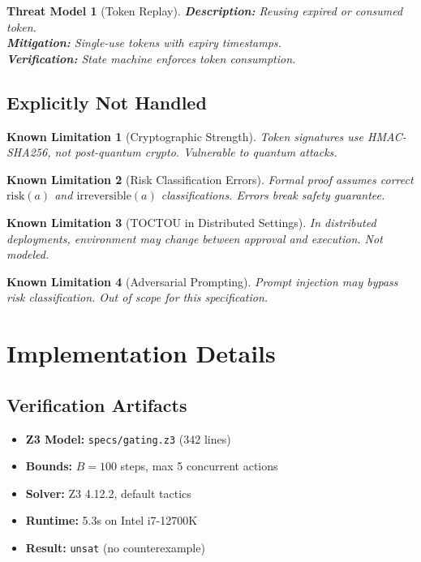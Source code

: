 \documentclass[12pt]{article}
\newtheorem{threat}{Threat Model}[section]
\newtheorem{limitation}{Known Limitation}[section]
\begin{document}
\begin{threat}[Token Replay]
\textbf{Description:} Reusing expired or consumed token.\\
\textbf{Mitigation:} Single-use tokens with expiry timestamps.\\
\textbf{Verification:} State machine enforces token consumption.
\end{threat}

\subsection{Explicitly Not Handled}

\begin{limitation}[Cryptographic Strength]
Token signatures use HMAC-SHA256, not post-quantum crypto. Vulnerable to quantum attacks.
\end{limitation}

\begin{limitation}[Risk Classification Errors]
Formal proof assumes correct $\text{risk}(a)$ and $\text{irreversible}(a)$ classifications. Errors break safety guarantee.
\end{limitation}

\begin{limitation}[TOCTOU in Distributed Settings]
In distributed deployments, environment may change between approval and execution. Not modeled.
\end{limitation}

\begin{limitation}[Adversarial Prompting]
Prompt injection may bypass risk classification. Out of scope for this specification.
\end{limitation}

\section{Implementation Details}

\subsection{Verification Artifacts}

\begin{itemize}
    \item \textbf{Z3 Model:} \texttt{specs/gating.z3} (342 lines)
    \item \textbf{Bounds:} $B=100$ steps, max 5 concurrent actions
    \item \textbf{Solver:} Z3 4.12.2, default tactics
    \item \textbf{Runtime:} 5.3s on Intel i7-12700K
    \item \textbf{Result:} \texttt{unsat} (no counterexample)
\end{itemize}
\end{document}
